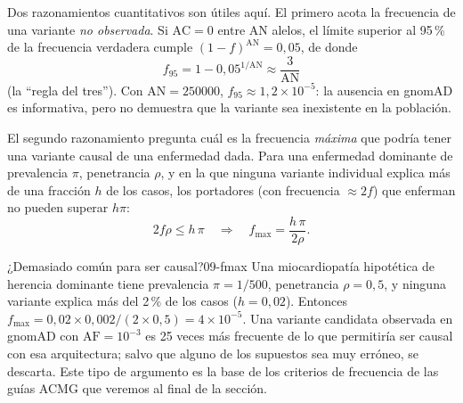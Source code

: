 Dos razonamientos cuantitativos son útiles aquí. El primero acota la frecuencia de una variante \emph{no observada}. Si $\mathrm{AC}=0$ entre $\mathrm{AN}$ alelos, el límite superior al 95\,\% de la frecuencia verdadera cumple $(1-f)^{\mathrm{AN}}=0{,}05$, de donde
\begin{equation}\label{eq:09-tres}
f_{95} = 1-0{,}05^{1/\mathrm{AN}} \approx \frac{3}{\mathrm{AN}}
\end{equation}
(la ``regla del tres''). Con $\mathrm{AN}=\num{250000}$, $f_{95}\approx1{,}2\times10^{-5}$: la ausencia en gnomAD es informativa, pero no demuestra que la variante sea inexistente en la población.

\begin{simbolos}
\end{simbolos}

El segundo razonamiento pregunta cuál es la frecuencia \emph{máxima} que podría tener una variante causal de una enfermedad dada. Para una enfermedad dominante de prevalencia $\pi$, penetrancia $\rho$, y en la que ninguna variante individual explica más de una fracción $h$ de los casos, los portadores (con frecuencia $\approx 2f$) que enferman no pueden superar $h\pi$:
\begin{equation}\label{eq:09-fmax}
2f\rho \le h\,\pi \quad\Longrightarrow\quad f_{\max} = \frac{h\,\pi}{2\rho}.
\end{equation}

\begin{simbolos}
\end{simbolos}

\begin{ejemplo}{¿Demasiado común para ser causal?}{09-fmax}
Una miocardiopatía hipotética de herencia dominante tiene prevalencia $\pi=1/500$, penetrancia $\rho=0{,}5$, y ninguna variante explica más del 2\,\% de los casos ($h=0{,}02$). Entonces $f_{\max}=0{,}02\times0{,}002/(2\times0{,}5)=4\times10^{-5}$. Una variante candidata observada en gnomAD con $\mathrm{AF}=10^{-3}$ es 25 veces más frecuente de lo que permitiría ser causal con esa arquitectura; salvo que alguno de los supuestos sea muy erróneo, se descarta. Este tipo de argumento es la base de los criterios de frecuencia de las guías ACMG que veremos al final de la sección.
\end{ejemplo}

